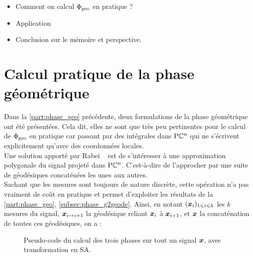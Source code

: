 
\begin{itemize}
	
	\item Comment on calcul $\Phi_{\text{\normalfont geo}}$ en pratique ?
	
	\item Application
	
	\item Conclusion sur le mémoire et perspective.
\end{itemize}




\section{Calcul pratique de la phase géométrique}

Dans la \cref{part:phase_geo} précédente, deux formulations de la phase géométrique ont été présentées. Cela dit, elles ne sont que très peu pertinentes pour le calcul de $\Phi_{\text{\normalfont geo}}$ en pratique car passant par des intégrales dans $\text{\normalfont P}\mathbb{C}^{n}$ qui ne s'écrivent explicitement qu'avec des coordonnées locales.
\\

Une solution apporté par Rabei \etal~\cite{rabei_bargmann_1999} est de s'intéresser à une approximation polygonale du signal projeté dans $\text{\normalfont P}\mathbb{C}^{n}$. 
C'est-à-dire de l'approcher par une suite de géodésiques concaténées les unes aux autres. 
\\
Sachant que les mesures sont toujours de nature discrète, cette opération n'a pas vraiment de coût en pratique et permet d'exploiter les résultats de la \cref{part:phase_geo}, \cref{subsec:phase_g2geode}. 
Ainsi, en notant $(\boldsymbol{x}_i)_{1\leqslant i\leqslant k}$ les $k$ mesures du signal, $\boldsymbol{x}_{i\rightarrow i+1}$ la géodésique reliant $\boldsymbol{x}_i$ à $\boldsymbol{x}_{i+1}$, et $\boldsymbol{x}$ la concaténation de toutes ces géodésiques, on a  :


\begin{figure}
	\caption{Pseudo-code du calcul des trois phases sur tout un signal $\boldsymbol{x}$, avec transformation en SA.}
	\label{fig:p-code_calc_phases}
\end{figure}

